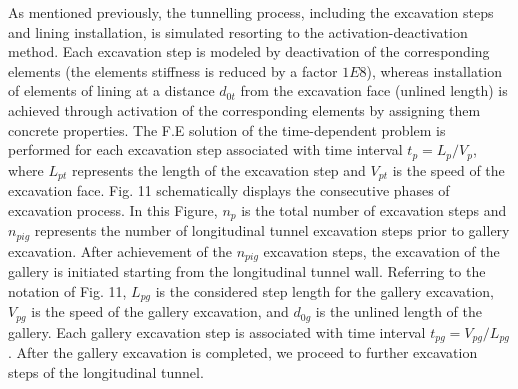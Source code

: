 \documentclass[Journal,letterpaper, NoLists,SectionNumbers]{ascelike-new}
\begin{document}
As mentioned previously, the tunnelling process, including the excavation steps and lining installation, is simulated resorting to the activation-deactivation method. Each excavation step is modeled by deactivation of the corresponding elements (the elements stiffness is reduced by a factor $1E8$), whereas installation of elements of lining at a distance $d_{0t}$ from the excavation face (unlined length) is achieved through activation of the corresponding elements by assigning them concrete properties. The F.E solution of the time-dependent problem is performed for each excavation step associated with time interval $t_p = L_p/V_p$, where $L_{pt}$ represents the length of the excavation step and $V_{pt}$ is the speed of the excavation face. Fig. 11 schematically displays the consecutive phases of excavation process. In this Figure, $n_p$ is the total number of excavation steps and $n_{pig}$ represents the number of longitudinal tunnel excavation steps prior to gallery excavation. After achievement of the $n_{pig}$ excavation steps, the excavation of the gallery is initiated starting from the longitudinal tunnel wall. Referring to the notation of Fig. 11,  $L_{pg}$ is the considered step length for the gallery excavation, $V_{pg}$ is the speed of the gallery excavation, and $d_{0g}$ is the unlined length of the gallery. Each gallery excavation step is associated with time interval $t_{pg} = V_{pg}/L_{pg}$. After the gallery excavation is completed, we proceed to further excavation steps of the longitudinal tunnel. 
\end{document}
